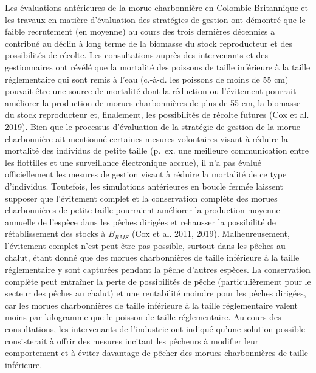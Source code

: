 \documentclass[11pt]{book}
\begin{document}
Les évaluations antérieures de la morue charbonnière en Colombie-Britannique et les travaux en matière d'évaluation des stratégies de gestion ont démontré que le faible recrutement (en moyenne) au cours des trois dernières décennies a contribué au déclin à long terme de la biomasse du stock reproducteur et des possibilités de récolte. Les consultations auprès des intervenants et des gestionnaires ont révélé que la mortalité des poissons de taille inférieure à la taille réglementaire qui sont remis à l'eau (c.-à-d. les poissons de moins de 55 cm) pouvait être une source de mortalité dont la réduction ou l'évitement pourrait améliorer la production de morues charbonnières de plus de 55 cm, la biomasse du stock reproducteur et, finalement, les possibilités de récolte futures (Cox et al. \protect\hyperlink{ref-cox2019evaluating}{2019}). Bien que le processus d'évaluation de la stratégie de gestion de la morue charbonnière ait mentionné certaines mesures volontaires visant à réduire la mortalité des individus de petite taille (p.~ex. une meilleure communication entre les flottilles et une surveillance électronique accrue), il n'a pas évalué officiellement les mesures de gestion visant à réduire la mortalité de ce type d'individus. Toutefois, les simulations antérieures en boucle fermée laissent supposer que l'évitement complet et la conservation complète des morues charbonnières de petite taille pourraient améliorer la production moyenne annuelle de l'espèce dans les pêches dirigées et rehausser la possibilité de rétablissement des stocks à \(B_{RMS}\) (Cox et al. \protect\hyperlink{ref-cox2011management}{2011}, \protect\hyperlink{ref-cox2019evaluating}{2019}). Malheureusement, l'évitement complet n'est peut-être pas possible, surtout dans les pêches au chalut, étant donné que des morues charbonnières de taille inférieure à la taille réglementaire y sont capturées pendant la pêche d'autres espèces. La conservation complète peut entraîner la perte de possibilités de pêche (particulièrement pour le secteur des pêches au chalut) et une rentabilité moindre pour les pêches dirigées, car les morues charbonnières de taille inférieure à la taille réglementaire valent moins par kilogramme que le poisson de taille réglementaire. Au cours des consultations, les intervenants de l'industrie ont indiqué qu'une solution possible consisterait à offrir des mesures incitant les pêcheurs à modifier leur comportement et à éviter davantage de pêcher des morues charbonnières de taille inférieure.
\end{document}
